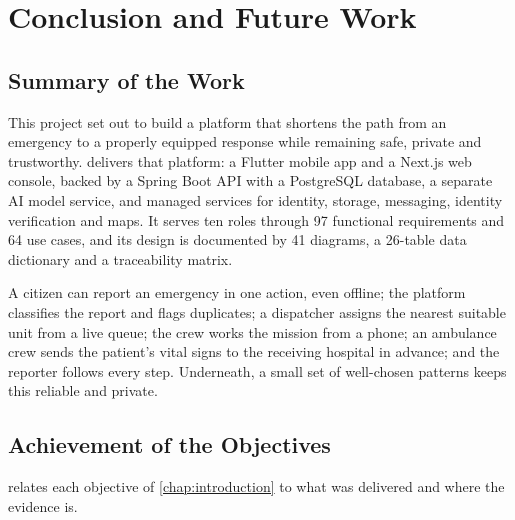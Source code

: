 \chapter{Conclusion and Future Work}\label{chap:conclusion}

\section{Summary of the Work}

This project set out to build a platform that shortens the path from an emergency to a properly equipped response while
remaining safe, private and trustworthy. \ProjectName{} delivers that platform: a Flutter mobile app and a Next.js web console,
backed by a Spring Boot API with a PostgreSQL database, a separate AI model service, and managed services for identity,
storage, messaging, identity verification and maps. It serves ten roles through 97 functional requirements and 64 use cases,
and its design is documented by 41 diagrams, a 26-table data dictionary and a traceability matrix.

A citizen can report an emergency in one action, even offline; the platform classifies the report and flags duplicates; a
dispatcher assigns the nearest suitable unit from a live queue; the crew works the mission from a phone; an ambulance crew
sends the patient's vital signs to the receiving hospital in advance; and the reporter follows every step. Underneath, a
small set of well-chosen patterns keeps this reliable and private.

\section{Achievement of the Objectives}

 relates each objective of \cref{chap:introduction} to what was delivered and where the evidence is.

